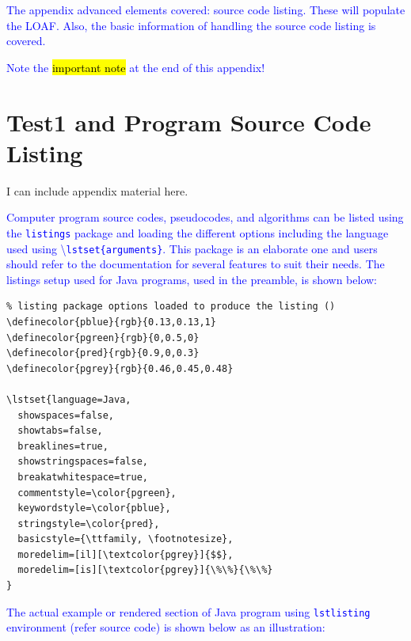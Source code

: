 \documentclass[phd]{ndsu-thesis-2022}
\newcommand\italk[1]{\textcolor{blue}{#1}}  %
\newcommand\cmd[1]{\textbackslash\texttt{#1}}  %
\newcommand\vb[1]{\textcolor{blue}{\texttt{#1}}}%
\begin{document}
\begin{landscape}
\end{landscape}




\italk{The appendix advanced elements covered: source code listing. These will populate the LOAF. Also, the basic information of handling the source code listing is covered. }

\italk{Note the \hl{important note} at the end of this appendix!}

\section{Test1 and Program Source Code Listing}
I can include appendix material here. \kant[9] 

\italk{Computer program source codes, pseudocodes, and algorithms can be listed using the \vb{listings} package and loading the different options including the language used using \cmd{lstset\{arguments\}}. This package is an elaborate one and users should refer to the documentation for several features to suit their needs. The listings setup used for Java programs, used in the preamble, is shown below:}

{\small
\singlespacing
\begin{verbatim}
% listing package options loaded to produce the listing ()
\definecolor{pblue}{rgb}{0.13,0.13,1}
\definecolor{pgreen}{rgb}{0,0.5,0}
\definecolor{pred}{rgb}{0.9,0,0.3}
\definecolor{pgrey}{rgb}{0.46,0.45,0.48}

\lstset{language=Java, 
  showspaces=false,
  showtabs=false,
  breaklines=true,
  showstringspaces=false,
  breakatwhitespace=true,
  commentstyle=\color{pgreen},
  keywordstyle=\color{pblue},
  stringstyle=\color{pred},
  basicstyle={\ttfamily, \footnotesize},
  moredelim=[il][\textcolor{pgrey}]{$$},
  moredelim=[is][\textcolor{pgrey}]{\%\%}{\%\%}
}
\end{verbatim}
}



\italk{The actual example or rendered section of Java program using \vb{lstlisting} environment (refer source code) is shown below as an illustration:}
\end{document}
